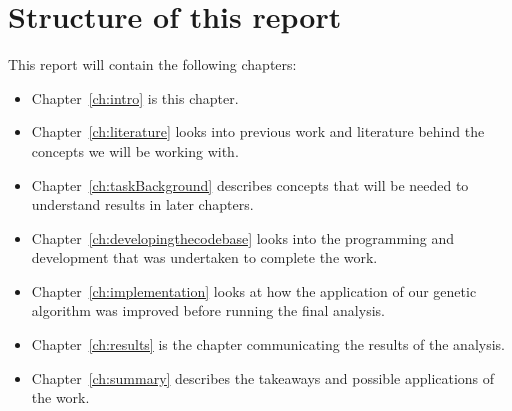 \section{Structure of this report}
This report will contain the following chapters:
\begin{itemize}
    \item Chapter~\ref{ch:intro} is this chapter.
    \item Chapter~\ref{ch:literature} looks into previous work and literature behind the concepts we will be working with.
    \item Chapter~\ref{ch:taskBackground} describes concepts that will be needed to understand results in later chapters.
    \item Chapter~\ref{ch:developingthecodebase} looks into the programming and development that was undertaken to complete the work.
    \item Chapter~\ref{ch:implementation} looks at how the application of our genetic algorithm was improved before running the final analysis.
    \item Chapter~\ref{ch:results} is the chapter communicating the results of the analysis.
    \item Chapter~\ref{ch:summary} describes the takeaways and possible applications of the work.
\end{itemize}